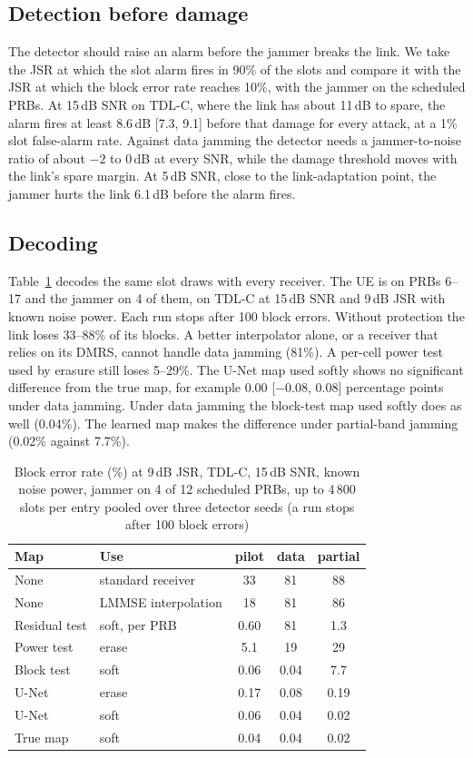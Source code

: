 \documentclass[conference]{IEEEtran}
\newenvironment{conly}{\par\color{Conly}}{\par}
\begin{document}
\ifstoryC
\begin{conly}
\subsection{Detection before damage}
The detector should raise an alarm before the jammer breaks the link. We take the JSR at which
the slot alarm fires in 90\% of the slots and compare it with the JSR at which the block error
rate reaches 10\%, with the jammer on the scheduled PRBs. At 15\,dB SNR on TDL-C, where the link
has about 11\,dB to spare, the alarm fires at least 8.6\,dB [7.3, 9.1] before that damage for
every attack, at a 1\% slot false-alarm rate. Against data jamming the detector needs a
jammer-to-noise ratio of about $-2$ to 0\,dB at every SNR, while the damage threshold moves with
the link's spare margin. At 5\,dB SNR, close to the link-adaptation point, the jammer hurts the
link 6.1\,dB before the alarm fires.
\end{conly}
\fi

\subsection{Decoding}
Table~\ref{tab:bler} decodes the same slot draws with every receiver. The UE is on PRBs 6--17 and
the jammer on 4 of them, on TDL-C at 15\,dB SNR and 9\,dB JSR with known noise power. Each run
stops after 100 block errors. Without protection the link loses 33--88\% of its blocks. A better
interpolator alone, or a receiver that relies on its DMRS, cannot handle data jamming (81\%). A
per-cell power test used by erasure still loses 5--29\%. The U-Net map used softly shows no significant
difference from the true map, for example 0.00 [$-0.08$, 0.08] percentage points under data
jamming. Under data jamming the block-test map used softly does as well (0.04\%). The learned map
makes the difference under partial-band jamming (0.02\% against 7.7\%).

\begin{table}[t]
\caption{Block error rate (\%) at 9\,dB JSR, TDL-C, 15\,dB SNR, known noise power, jammer on 4 of 12
scheduled PRBs, up to 4\,800 slots per entry pooled over three detector seeds (a run stops after
100 block errors)}
\label{tab:bler}
\centering
\footnotesize
\begin{tabular}{@{}llccc@{}}
\toprule
Map & Use & pilot & data & partial \\
\midrule
None & standard receiver & 33 & 81 & 88 \\
None & LMMSE interpolation & 18 & 81 & 86 \\
Residual test & soft, per PRB & 0.60 & 81 & 1.3 \\
Power test & erase & 5.1 & 19 & 29 \\
Block test & soft & 0.06 & 0.04 & 7.7 \\
U-Net & erase & 0.17 & 0.08 & 0.19 \\
U-Net & soft & 0.06 & 0.04 & 0.02 \\
True map & soft & 0.04 & 0.04 & 0.02 \\
\bottomrule
\end{tabular}
\end{table}
\end{document}
